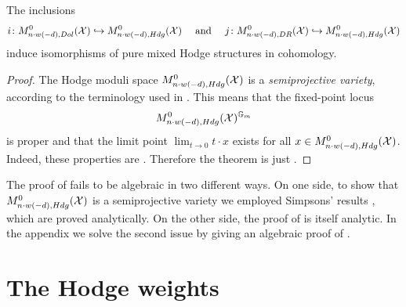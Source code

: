 \documentclass{article}
\begin{document}
\begin{thm} \label{thm: isomorphic cohomologies}
The inclusions
\begin{equation}
i \colon M_{n \cdot w(-d), Dol}^0(\mathcal{X}) \hookrightarrow M_{n \cdot w(-d), Hdg}^{0}(\mathcal{X}) \quad \text{ and } \quad j \colon M_{n \cdot w(-d), DR}^0(\mathcal{X}) \hookrightarrow M_{n \cdot w(-d), Hdg}^{0}(\mathcal{X})
\end{equation}
induce isomorphisms of pure mixed Hodge structures in cohomology.
\end{thm}
\begin{proof}
The Hodge moduli space $M_{n \cdot w(-d), Hdg}^0(\mathcal{X})$ is a \textit{semiprojective variety}, according to the terminology used in \cite[]{Hausel-RodriguezVillega}. This means that the fixed-point locus 
\begin{equation}
M_{n \cdot w(-d), Hdg}^0(\mathcal{X})^{\mathbb{G}_m}
\end{equation}
is proper and that the limit point $\displaystyle \lim_{t \to 0} t \cdot x$ exists for all $x \in M_{n \cdot w(-d), Hdg}^0(\mathcal{X})$. Indeed, these properties are \cite[Lemma 10.4, Corollary 10.3]{Simpson-Hodge-filtration}.
Therefore the theorem is just \cite[Corollary 1.3.3]{Hausel-RodriguezVillega}.
\end{proof}

\begin{rmk}
The proof of  fails to be algebraic in two different ways. On one side, to show that $M_{n \cdot w(-d), Hdg}^0(\mathcal{X})$ is a semiprojective variety we employed Simpsons' results \cite[Lemma 10.4, Corollary 10.3]{Simpson-Hodge-filtration}, which are proved analytically. On the other side, the proof of \cite[Corollary 1.3.3]{Hausel-RodriguezVillega} is itself analytic. In the appendix we solve the second issue by giving an algebraic proof of \cite[Corollary 1.3.3]{Hausel-RodriguezVillega}.
\end{rmk}

\section{The Hodge weights}

\appendix



\printbibliography
\end{document}
